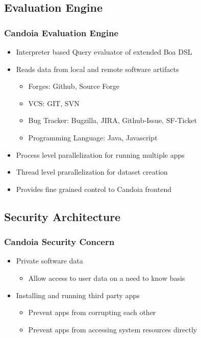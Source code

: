     \subsection{Evaluation Engine}
        \begin{frame}
            \frametitle{Candoia Evaluation Engine}
            \begin{itemize}
                \item Interpreter based Query evaluator of extended Boa DSL
                \item Reads data from local and remote software artifacts
                    \begin{itemize}
                        \item Forges: Github, Source Forge
                        \item VCS: GIT, SVN
                        \item Bug Tracker: Bugzilla, JIRA, Github-Issue, SF-Ticket
                        \item Programming Language: Java, Javascript
                    \end{itemize}
                \item Process level parallelization for running multiple apps
                \item Thread level prarallelization for dataset creation
                \item Provides fine grained control to Candoia frontend
                \end{itemize}
            \end{frame}



    \subsection{Security Architecture}
        \begin{frame}
            \frametitle{Candoia Security Concern}
            \begin{itemize}
                \item Private software data
                    \begin{itemize}
                        \item Allow access to user data on a need to know basis
                    \end{itemize}
                \item Installing and running third party apps
                    \begin{itemize}
                        \item Prevent apps from corrupting each other
                        \item Prevent apps from accessing system resources directly
                    \end{itemize}
            \end{itemize}
         \end{frame}

